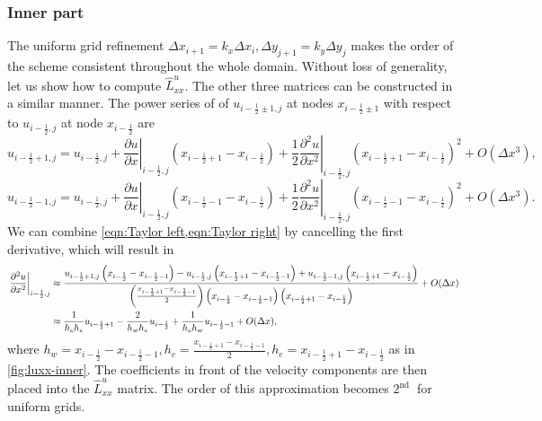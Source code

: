\documentclass{article}
\numberwithin{equation}{section}
\begin{document}
\subsubsection{Inner part}\label{subsubsec:laplacian-inner}
The uniform grid refinement $\Delta x_{i+1}=k_x\Delta x_i,\Delta y_{j+1}=k_y\Delta y_j$ makes the order of the scheme consistent throughout the whole domain. Without loss of generality, let us show how to compute $\hat{L}^u_{xx}$. The other three matrices can be constructed in a similar manner. The power series of of $u_{i-\frac{1}{2}\pm 1,j}$ at nodes $x_{i - \frac{1}{2}\pm 1}$ with respect to $u_{i - \frac{1}{2},j}$ at node $x_{i-\frac{1}{2}}$ are
\begin{equation}\label{eqn:Taylor right} 
	u_{i-\frac{1}{2}+1,j}=u_{i-\frac{1}{2},j}+\left.\frac{\partial u}{\partial x}\right|_{i-\frac{1}{2},j}\left(x_{i-\frac{1}{2}+1}-x_{i-\frac{1}{2}}\right)+\frac{1}{2}\left.\frac{\partial^2 u}{\partial x^2}\right|_{i-\frac{1}{2},j}\left(x_{i-\frac{1}{2}+1}-x_{i-\frac{1}{2}}\right)^2+O\left(\Delta x^3\right),
\end{equation}
\begin{equation}\label{eqn:Taylor left} 
	u_{i-\frac{1}{2}-1,j}=u_{i-\frac{1}{2},j}+\left.\frac{\partial u}{\partial x}\right|_{i-\frac{1}{2},j}\left(x_{i-\frac{1}{2}-1}-x_{i-\frac{1}{2}}\right)+\frac{1}{2}\left.\frac{\partial^2 u}{\partial x^2}\right|_{i-\frac{1}{2},j}\left(x_{i-\frac{1}{2}-1}-x_{i-\frac{1}{2}}\right)^2+O\left(\Delta x^3\right).
\end{equation}
We can combine \cref{eqn:Taylor left,eqn:Taylor right} by cancelling the first derivative, which will result in
\begin{align}\label{eqn:laplacian-discretization-non-uniform-dx}
\left.\frac{\partial^2 u}{\partial x^2}\right|_{i-\frac{1}{2},j} & \approx \frac{u_{i-\frac{1}{2}+1,j}\left(x_{i-\frac{1}{2}}-x_{i-\frac{1}{2}-1}\right)-u_{i-\frac{1}{2},j}\left(x_{i-\frac{1}{2}+1}-x_{i-\frac{1}{2}-1}\right)+u_{i-\frac{1}{2}-1,j}\left(x_{i-\frac{1}{2}+1}-x_{i-\frac{1}{2}}\right)}{\left(\frac{x_{i-\frac{1}{2}+1}-x_{i-\frac{1}{2}-1}}{2}\right)\left(x_{i-\frac{1}{2}}-x_{i-\frac{1}{2}-1}\right)\left(x_{i-\frac{1}{2}+1}-x_{i-\frac{1}{2}}\right)}+O(\Delta x)\notag\\
& \approx \frac{1}{h_c h_e}u_{i-\frac{1}{2}+1} - \frac{2}{h_w h_e}u_{i-\frac{1}{2}} + \frac{1}{h_c h_w}u_{i-\frac{1}{2}-1} + O(\Delta x),
\end{align}
where $h_w=x_{i-\frac{1}{2}}-x_{i-\frac{1}{2}-1},h_c = \frac{x_{i-\frac{1}{2}+1}-x_{i-\frac{1}{2}-1}}{2}, h_e = x_{i-\frac{1}{2}+1}-x_{i-\frac{1}{2}}$ as in \cref{fig:luxx-inner}. The coefficients in front of the velocity components are then placed into the $\hat{L}^u_{xx}$ matrix. The order of this approximation becomes $2^{\text {nd }}$ for uniform grids. 
\end{document}
